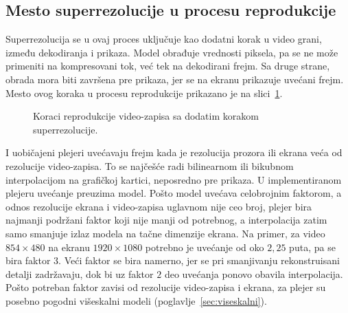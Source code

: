 \documentclass[12pt,a4paper]{article}
\begin{document}
\subsection{Mesto superrezolucije u procesu reprodukcije}

Superrezolucija se u ovaj proces uključuje kao dodatni korak u video grani, između dekodiranja i prikaza. Model obrađuje vrednosti piksela, pa se ne može primeniti na kompresovani tok, već tek na dekodirani frejm. Sa druge strane, obrada mora biti završena pre prikaza, jer se na ekranu prikazuje uvećani frejm. Mesto ovog koraka u procesu reprodukcije prikazano je na slici~\ref{fig:koraci_reprodukcije_videa_sr}.

\begin{figure}[H]
	\centering
	\resizebox{\textwidth}{!}{}
	\caption{Koraci reprodukcije video-zapisa sa dodatim korakom superrezolucije.}
	\label{fig:koraci_reprodukcije_videa_sr}
\end{figure}

I uobičajeni plejeri uvećavaju frejm kada je rezolucija prozora ili ekrana veća od rezolucije video-zapisa. To se najčešće radi bilinearnom ili bikubnom interpolacijom na grafičkoj kartici, neposredno pre prikaza. U implementiranom plejeru uvećanje preuzima model. Pošto model uvećava celobrojnim faktorom, a odnos rezolucije ekrana i video-zapisa uglavnom nije ceo broj, plejer bira najmanji podržani faktor koji nije manji od potrebnog, a interpolacija zatim samo smanjuje izlaz modela na tačne dimenzije ekrana. Na primer, za video $854\times480$ na ekranu $1920\times1080$ potrebno je uvećanje od oko $2{,}25$ puta, pa se bira faktor $3$. Veći faktor se bira namerno, jer se pri smanjivanju rekonstruisani detalji zadržavaju, dok bi uz faktor $2$ deo uvećanja ponovo obavila interpolacija. Pošto potreban faktor zavisi od rezolucije video-zapisa i ekrana, za plejer su posebno pogodni višeskalni modeli (poglavlje~\ref{sec:viseskalni}).
\end{document}
